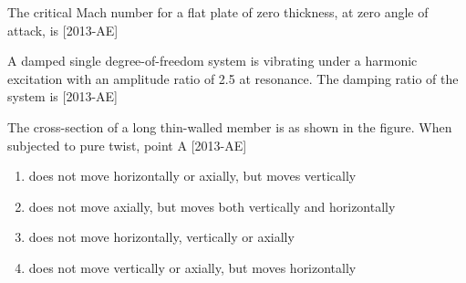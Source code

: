 \iffalse
\chapter{2013}
\author{AI24BTECH11028}
\section{ae}
\fi

    \item The critical Mach number for a flat plate of zero thickness, at zero angle of attack, is \underline{\hspace{2cm}}  \hfill{[2013-AE]}

    \item A damped single degree-of-freedom system is vibrating under a harmonic excitation with an amplitude ratio of 2.5 at resonance. The damping ratio of the system is \underline{\hspace{2cm}} \hfill{[2013-AE]}

    \item The cross-section of a long thin-walled member is as shown in the figure. When subjected to pure twist, point A  \hfill{[2013-AE]}
    
    \begin{figure}[!ht]
    \centering
    \label{fig:my_label}
    \end{figure}
    \begin{enumerate}
        \item does not move horizontally or axially, but moves vertically 
        \item does not move axially, but moves both vertically and horizontally
        \item does not move horizontally, vertically or axially
        \item does not move vertically or axially, but moves horizontally
    \end{enumerate} 

